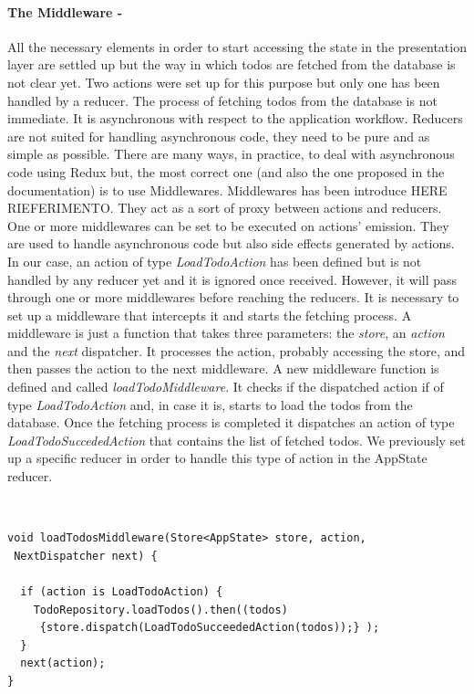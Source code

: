 \paragraph{The Middleware - }
\label{subpar:todo_app_bloc_core_state}
All the necessary elements in order to start accessing the state in the presentation layer are settled up but the way in which todos are fetched from the database is not clear yet. Two actions were set up for this purpose but only one has been handled by a reducer. The process of fetching todos from the database is not immediate. It is asynchronous with respect to the application workflow. Reducers are not suited for handling asynchronous code, they need to be pure and as simple as possible. There are many ways, in practice, to deal with asynchronous code using Redux but, the most correct one (and also the one proposed in the documentation) is to use Middlewares. Middlewares has been introduce HERE RIEFERIMENTO. They act as a sort of proxy between actions and reducers. One or more middlewares can be set to be executed on actions' emission. They are used to handle asynchronous code but also side effects generated by actions. In our case, an action of type \textit{LoadTodoAction} has been defined but is not handled by any reducer yet and it is ignored once received. However, it will pass through one or more middlewares before reaching the reducers. It is necessary  to set up a middleware that intercepts it and starts the fetching process. A middleware is just a function that takes three parameters: the \textit{store}, an \textit{action} and the \textit{next} dispatcher. It processes the action, probably accessing the store, and then passes the action to the next middleware. A new middleware function is defined and called \textit{loadTodoMiddleware}. It  checks if the dispatched action if of type \textit{LoadTodoAction} and, in case it is, starts to load the todos from the database. Once the fetching process is completed it dispatches an action of type \textit{LoadTodoSuccededAction} that contains the list of fetched todos. We previously set up a specific reducer in order to handle this type of action in the AppState reducer.
\begin{code}
\mbox{}\\
 \mbox{}
		\label{code:2.14}
\begin{verbatim}
void loadTodosMiddleware(Store<AppState> store, action,
 NextDispatcher next) {

  if (action is LoadTodoAction) {
    TodoRepository.loadTodos().then((todos)
     {store.dispatch(LoadTodoSucceededAction(todos));} );
  }
  next(action);
}
\end{verbatim}
\mbox{}
\end{code}

